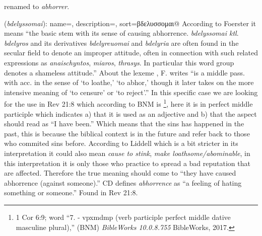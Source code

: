 \item[\sout{Abominable},] renamed to \emph{abhorrer}.
\item[Abhorrer,]

(\textit{bdelyssomai}):
{
    name=,
    description={},
    sort=βδελυσσομαι@
}
According to Foerster it means ``the basic stem with its sense of causing abhorrence. \emph{bdelyssomai ktl}. \emph{bdelyros} and its derivatives
\emph{bdelyreuomai} and \emph{bdelyria} are often found in the secular field to denote an improper attitude, often in connection with such related expressions
as \emph{anaischyntos}, \emph{miaros}, \emph{thrasys}. In particular this word group denotes a shameless attitude.''
About the lexeme , F. writes ``is a middle pass. with acc. in the sense of `to loathe,' `to abhor,' though it later takes on the more intensive
meaning of `to censure' or `to reject'.''
In this specific case we are looking for the use in Rev 21:8 which according to BNM is \footnote{1 Cor 6:9; word ``7.  -
vpxmdmp (verb participle perfect middle dative masculine plural),'' (BNM) \emph{BibleWorks 10.0.8.755} BibleWorks, 2017.},
here it is in perfect middle participle which indicates a) that it is used as an adjective and b) that the aspect should read as ``I have been.'' Which means that the sins has happened
in the past, this is because the biblical context is in the future and refer back to those who commited sins before. According to Liddell which is a bit stricter in its interpretation
it could also mean \emph{cause to stink}, \emph{make loathsome/abominable}, in this interpretation it is only those who practice to spread a bad reputation that are affected.
Therefore the true meaning should come to ``they have caused abhorrence (against someone).'' CD defines \emph{abhorrence} as ``a feeling of hating something or someone.''
Found in Rev 21:8.